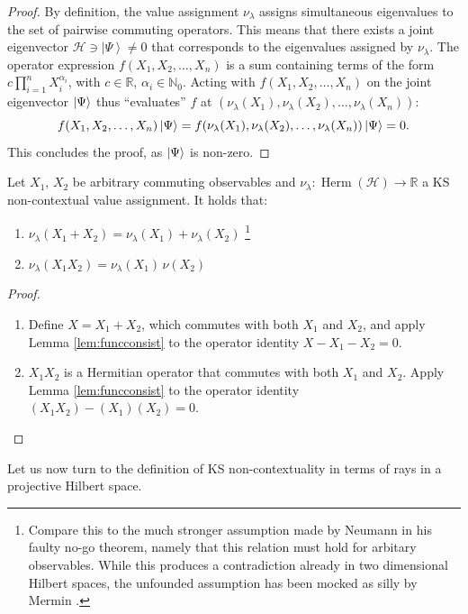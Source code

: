 \begin{proof}
By definition, the value assignment $\nu_{\lambda}$ assigns simultaneous eigenvalues to the set of pairwise commuting operators. This means that there exists a joint eigenvector $\mathcal{H}\ni\left|\Psi\right\rangle \neq0$ that corresponds to the eigenvalues assigned by $\nu_{\lambda}$. The operator expression $f(X_{1},X_{2},\dots,X_{n})$ is a sum containing terms of the form $c\prod_{i=1}^{n}X_{i}^{\alpha_{i}}$, with $c\in\mathbb{R}$, $\alpha_{i}\in\mathbb{N}_{0}$. Acting with $f(X_{1},X_{2},\dots,X_{n})$ on the joint eigenvector $\ket{\Psi}$ thus “evaluates” $f$ at $(\nu_{\lambda}(X_{1}),\nu_{\lambda}(X_{2}),\dots,\nu_{\lambda}(X_{n})):$\begin{equation*}
f(X_{1},X_{2},\dots,X_{n})\ket{\Psi} =f(\nu_{\lambda}(X_{1}),\nu_{\lambda}(X_{2}),\dots,\nu_{\lambda}(X_{n}))\ket{\Psi} =0.\end{equation*} This concludes the proof, as $\ket{\Psi}$  is non-zero.
\end{proof}

\begin{corollary}
\label{cor:funcconsist}
Let $X_1$, $X_2$ be arbitrary commuting observables and $\nu_{\lambda}:\operatorname{Herm}(\mathcal{H})\rightarrow\mathbb{R}$ a KS non-contextual value assignment. It holds that:
\begin{enumerate}
\item{$\nu_{\lambda}(X_1+X_2)=\nu_{\lambda}(X_1)+\nu_{\lambda}(X_2)$ \footnote{Compare this to the much stronger assumption made by Neumann in his faulty no-go theorem, namely that this relation must hold for arbitary observables. While this produces a contradiction already in two dimensional Hilbert spaces, the unfounded assumption has been mocked as silly by Mermin \cite{Mermin1993}.}}
\item{$\nu_{\lambda}(X_1X_2)=\nu_{\lambda}(X_1)\,\nu(X_2)$}
\end{enumerate}
\end{corollary}

\begin{proof}\hfill
\begin{enumerate}
\item{Define $X=X_1+X_2$, which commutes with both $X_1$ and $X_2$, and apply Lemma \ref{lem:funcconsist} to the operator identity $X-X_1-X_2=0$.}
\item{$X_1X_2$ is a Hermitian operator that commutes with both $X_1$ and $X_2$. Apply Lemma \ref{lem:funcconsist} to the operator identity $(X_1X_2)-(X_1)(X_2)=0$.}
\end{enumerate}
\end{proof}
Let us now turn to the definition of KS non-contextuality in terms of rays in a projective Hilbert space.

